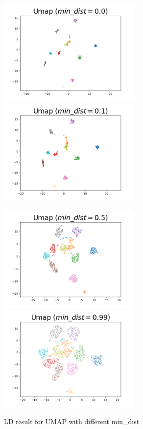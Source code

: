 \begin{figure}[H]
\centering  %
{
\label{Fig.sub.1}
\includegraphics[width=7cm,height=3.5cm\textwidth]{images/umap/umap_min_dist_0.0.png}}
{
\label{Fig.sub.2}
\includegraphics[width=7cm,height=3.5cm\textwidth]{images/umap/umap_min_dist_0.1.png}}

\centering  %
{
\label{Fig.sub.1}
\includegraphics[width=7cm,height=3.5cm\textwidth]{images/umap/umap_min_dist_0.5.png}}
{
\label{Fig.sub.2}
\includegraphics[width=7cm,height=3.5cm\textwidth]{images/umap/umap_min_dist_0.99.png}}
\caption{LD result for UMAP with different min\_dist}
\end{figure}


